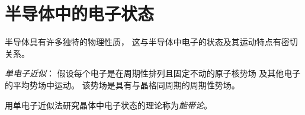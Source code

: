 \chapter{半导体中的电子状态}

半导体具有许多独特的物理性质，
这与半导体中电子的状态及其运动特点有密切关系。

\emph{单电子近似}：
假设每个电子是在周期性排列且固定不动的原子核势场
及其他电子的平均势场中运动。
该势场是具有与晶格同周期的周期性势场。

用单电子近似法研究晶体中电子状态的理论称为\emph{能带论}。


% 
